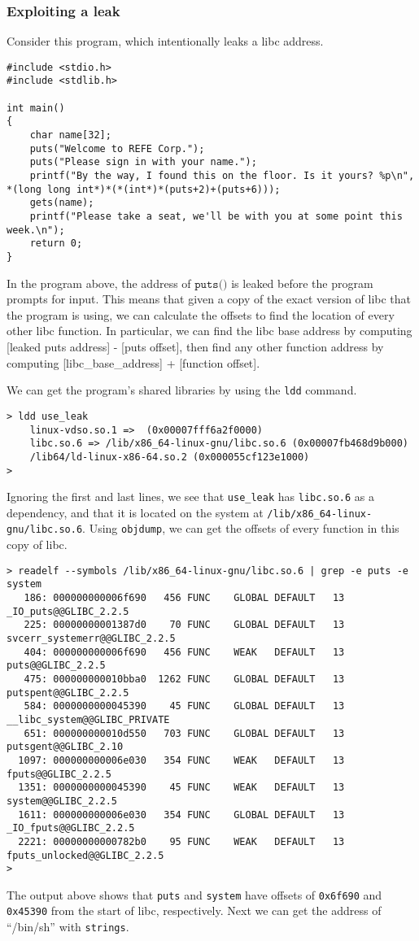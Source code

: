 \documentclass{article}
\begin{document}
\subsubsection{Exploiting a leak}
Consider this program, which intentionally leaks a libc address.

\begin{lstlisting}
#include <stdio.h>
#include <stdlib.h>

int main()
{
	char name[32];
	puts("Welcome to REFE Corp.");
	puts("Please sign in with your name.");
    printf("By the way, I found this on the floor. Is it yours? %p\n", *(long long int*)*(*(int*)*(puts+2)+(puts+6)));
	gets(name);
	printf("Please take a seat, we'll be with you at some point this week.\n");
	return 0;
}
\end{lstlisting}

In the program above, the address of $\texttt{puts()}$ is leaked before the
program prompts for input. This means that given a copy of the exact version of
libc that the program is using, we can calculate the offsets to find the
location of every other libc function. In particular, we can find the libc base
address by computing [leaked puts address] - [puts offset], then find any other
function address by computing [libc\_base\_address] + [function offset].

We can get the program's shared libraries by using the \texttt{ldd} command.
\begin{lstlisting}
> ldd use_leak
	linux-vdso.so.1 =>  (0x00007fff6a2f0000)
	libc.so.6 => /lib/x86_64-linux-gnu/libc.so.6 (0x00007fb468d9b000)
	/lib64/ld-linux-x86-64.so.2 (0x000055cf123e1000)
> 
\end{lstlisting}

Ignoring the first and last lines, we see that \texttt{use\_leak} has
\texttt{libc.so.6} as a dependency, and that it is located on the system at
\texttt{/lib/x86\_64-linux-gnu/libc.so.6}. Using \texttt{objdump}, we can get the
offsets of every function in this copy of libc.
\begin{lstlisting}
> readelf --symbols /lib/x86_64-linux-gnu/libc.so.6 | grep -e puts -e system
   186: 000000000006f690   456 FUNC    GLOBAL DEFAULT   13 _IO_puts@@GLIBC_2.2.5
   225: 00000000001387d0    70 FUNC    GLOBAL DEFAULT   13 svcerr_systemerr@@GLIBC_2.2.5
   404: 000000000006f690   456 FUNC    WEAK   DEFAULT   13 puts@@GLIBC_2.2.5
   475: 000000000010bba0  1262 FUNC    GLOBAL DEFAULT   13 putspent@@GLIBC_2.2.5
   584: 0000000000045390    45 FUNC    GLOBAL DEFAULT   13 __libc_system@@GLIBC_PRIVATE
   651: 000000000010d550   703 FUNC    GLOBAL DEFAULT   13 putsgent@@GLIBC_2.10
  1097: 000000000006e030   354 FUNC    WEAK   DEFAULT   13 fputs@@GLIBC_2.2.5
  1351: 0000000000045390    45 FUNC    WEAK   DEFAULT   13 system@@GLIBC_2.2.5
  1611: 000000000006e030   354 FUNC    GLOBAL DEFAULT   13 _IO_fputs@@GLIBC_2.2.5
  2221: 00000000000782b0    95 FUNC    WEAK   DEFAULT   13 fputs_unlocked@@GLIBC_2.2.5
> 
\end{lstlisting}
The output above shows that \texttt{puts} and \texttt{system} have offsets of
\texttt{0x6f690} and \texttt{0x45390} from the start of libc,
respectively. Next we can get the address of ``/bin/sh'' with \texttt{strings}.
\end{document}
